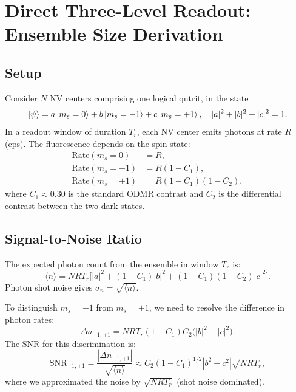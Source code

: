 \documentclass[11pt,letterpaper]{article}
\begin{document}
\section{Direct Three-Level Readout: Ensemble Size Derivation}
\label{sec:direct}

\subsection{Setup}

Consider $N$ NV centers comprising one logical qutrit, in the state
\begin{equation}
  \ket{\psi} = a \ket{m_s = 0} + b \ket{m_s = -1} + c \ket{m_s = +1},
  \quad |a|^2 + |b|^2 + |c|^2 = 1.
\end{equation}
In a readout window of duration $T_r$, each NV center emits photons at rate
$R$ (cps).  The fluorescence depends on the spin state:
\begin{align}
  \text{Rate}(m_s = 0) &= R, \\
  \text{Rate}(m_s = -1) &= R(1 - C_1), \\
  \text{Rate}(m_s = +1) &= R(1 - C_1)(1 - C_2),
\end{align}
where $C_1 \approx 0.30$ is the standard ODMR contrast %
and $C_2$ is the
differential contrast between the two dark states.

\subsection{Signal-to-Noise Ratio}

The expected photon count from the ensemble in window $T_r$ is:
\begin{equation}
  \langle n \rangle = N R T_r \big[ |a|^2 + (1-C_1)|b|^2 + (1-C_1)(1-C_2)|c|^2 \big].
\end{equation}
Photon shot noise gives $\sigma_n = \sqrt{\langle n \rangle}$.

To distinguish $m_s = -1$ from $m_s = +1$, we need to resolve the difference
in photon rates:
\begin{equation}
  \Delta n_{-1,+1} = N R T_r (1-C_1) C_2 \big( |b|^2 - |c|^2 \big).
\end{equation}
The SNR for this discrimination is:
\begin{equation}
  \text{SNR}_{-1,+1} = \frac{|\Delta n_{-1,+1}|}{\sqrt{\langle n \rangle}}
  \approx C_2 (1 - C_1)^{1/2} |b^2 - c^2| \sqrt{N R T_r},
  \label{eq:snr_direct}
\end{equation}
where we approximated the noise by $\sqrt{N R T_r}$ (shot noise dominated).
\end{document}
